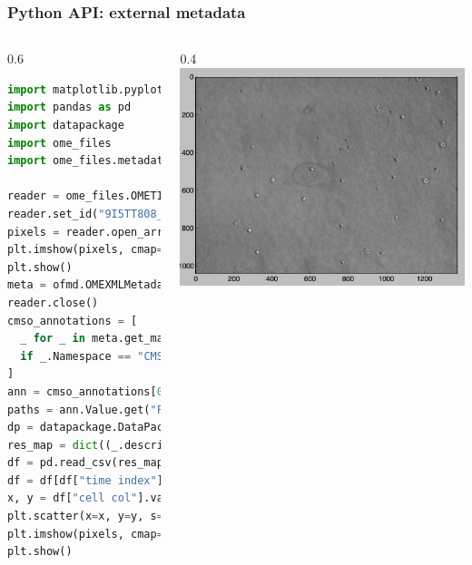 \documentclass{beamer}
\begin{document}
\begin{frame}[fragile]
  \frametitle{Python API: external metadata}

  \begin{columns}
    \begin{column}{0.6\textwidth}
      \centering
      \begin{lstlisting}[language=Python,basicstyle=\tiny\ttfamily]
import matplotlib.pyplot as plt
import pandas as pd
import datapackage
import ome_files
import ome_files.metadata as ofmd

reader = ome_files.OMETIFFReader()
reader.set_id("9I5TT808_F00000010.companion.ome")
pixels = reader.open_array(0)
plt.imshow(pixels, cmap="gray")
plt.show()
meta = ofmd.OMEXMLMetadata(reader.get_ome_xml())
reader.close()
cmso_annotations = [
  _ for _ in meta.get_map_annotations()
  if _.Namespace == "CMSO/dpkg"
]
ann = cmso_annotations[0]
paths = ann.Value.get("FilePath")
dp = datapackage.DataPackage(paths[0])
res_map = dict((_.descriptor["name"], _.local_data_path) for _ in dp.resources)
df = pd.read_csv(res_map["objects_table"])
df = df[df["time index"] == 0]
x, y = df["cell col"].values, df["cell row"].values
plt.scatter(x=x, y=y, s=100, edgecolors='b', facecolors='none')
plt.imshow(pixels, cmap="gray")
plt.show()
      \end{lstlisting}
    \end{column}
    \begin{column}{0.4\textwidth}
      \centering
      \includegraphics[width=\textwidth]{figures/tracking.png}\\
      \vspace{.5em}

\end{column}
\end{columns}
\end{frame}
\end{document}
